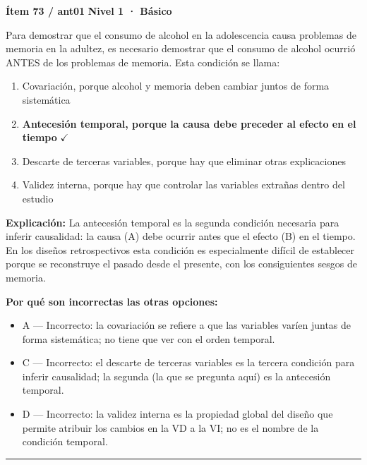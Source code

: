 \documentclass[12pt,a4paper]{article}
\begin{document}
\begin{mdframed}[backgroundcolor=fondogris,linecolor=azul,linewidth=1pt,innerleftmargin=10pt,innerrightmargin=10pt,innertopmargin=7pt,innerbottommargin=7pt]
\textbf{Ítem 73 / ant01} \hfill {\small\bfseries\color{azul} Nivel 1 · Básico}
\end{mdframed}

Para demostrar que el consumo de alcohol en la adolescencia causa problemas de memoria en la adultez, es necesario demostrar que el consumo de alcohol ocurrió ANTES de los problemas de memoria. Esta condición se llama:

\begin{enumerate}
  \item[A.] Covariación, porque alcohol y memoria deben cambiar juntos de forma sistemática
  \item[\textbf{\color{verde}B.}] \textbf{\color{verde} Antecesión temporal, porque la causa debe preceder al efecto en el tiempo} \hfill $\checkmark$
  \item[C.] Descarte de terceras variables, porque hay que eliminar otras explicaciones
  \item[D.] Validez interna, porque hay que controlar las variables extrañas dentro del estudio
\end{enumerate}

\noindent\textbf{\color{azul}Explicación:} La antecesión temporal es la segunda condición necesaria para inferir causalidad: la causa (A) debe ocurrir antes que el efecto (B) en el tiempo. En los diseños retrospectivos esta condición es especialmente difícil de establecer porque se reconstruye el pasado desde el presente, con los consiguientes sesgos de memoria.

\noindent\textbf{\color{gris}Por qué son incorrectas las otras opciones:}
\begin{itemize}
  \item {\small A — Incorrecto: la covariación se refiere a que las variables varíen juntas de forma sistemática; no tiene que ver con el orden temporal.}
  \item {\small C — Incorrecto: el descarte de terceras variables es la tercera condición para inferir causalidad; la segunda (la que se pregunta aquí) es la antecesión temporal.}
  \item {\small D — Incorrecto: la validez interna es la propiedad global del diseño que permite atribuir los cambios en la VD a la VI; no es el nombre de la condición temporal.}
\end{itemize}
\vspace{8pt}\hrule\vspace{10pt}
\end{document}
